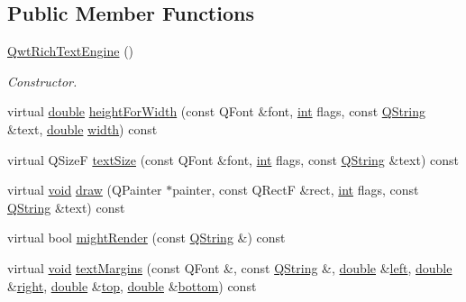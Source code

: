 \subsection*{Public Member Functions}
\begin{DoxyCompactItemize}
\item 
\hyperlink{class_qwt_rich_text_engine_aa4c1d5a1ee88d7406ba1d6453005b46a}{Qwt\-Rich\-Text\-Engine} ()
\begin{DoxyCompactList}\small\item\em Constructor. \end{DoxyCompactList}\item 
virtual \hyperlink{_super_l_u_support_8h_a8956b2b9f49bf918deed98379d159ca7}{double} \hyperlink{class_qwt_rich_text_engine_ab19cc5ad4ae33aaffc6aaf5d58b93b19}{height\-For\-Width} (const Q\-Font \&font, \hyperlink{ioapi_8h_a787fa3cf048117ba7123753c1e74fcd6}{int} flags, const \hyperlink{group___u_a_v_objects_plugin_gab9d252f49c333c94a72f97ce3105a32d}{Q\-String} \&text, \hyperlink{_super_l_u_support_8h_a8956b2b9f49bf918deed98379d159ca7}{double} \hyperlink{glext_8h_a76aaa5c50746272e7d2de9aece921757}{width}) const 
\item 
virtual Q\-Size\-F \hyperlink{class_qwt_rich_text_engine_a0dc185454c60931a0c136fc61774abfb}{text\-Size} (const Q\-Font \&font, \hyperlink{ioapi_8h_a787fa3cf048117ba7123753c1e74fcd6}{int} flags, const \hyperlink{group___u_a_v_objects_plugin_gab9d252f49c333c94a72f97ce3105a32d}{Q\-String} \&text) const 
\item 
virtual \hyperlink{group___u_a_v_objects_plugin_ga444cf2ff3f0ecbe028adce838d373f5c}{void} \hyperlink{class_qwt_rich_text_engine_a8f345540be2a90db3ce5a252ec443ce7}{draw} (Q\-Painter $\ast$painter, const Q\-Rect\-F \&rect, \hyperlink{ioapi_8h_a787fa3cf048117ba7123753c1e74fcd6}{int} flags, const \hyperlink{group___u_a_v_objects_plugin_gab9d252f49c333c94a72f97ce3105a32d}{Q\-String} \&text) const 
\item 
virtual bool \hyperlink{class_qwt_rich_text_engine_a42da46eee5fbda55e34b18c64b0b5e0b}{might\-Render} (const \hyperlink{group___u_a_v_objects_plugin_gab9d252f49c333c94a72f97ce3105a32d}{Q\-String} \&) const 
\item 
virtual \hyperlink{group___u_a_v_objects_plugin_ga444cf2ff3f0ecbe028adce838d373f5c}{void} \hyperlink{class_qwt_rich_text_engine_a3d507f2cad8ce44d0ee5da3070b943ca}{text\-Margins} (const Q\-Font \&, const \hyperlink{group___u_a_v_objects_plugin_gab9d252f49c333c94a72f97ce3105a32d}{Q\-String} \&, \hyperlink{_super_l_u_support_8h_a8956b2b9f49bf918deed98379d159ca7}{double} \&\hyperlink{glext_8h_a85b8f6c07fbc1fb5d77c2ae090f21995}{left}, \hyperlink{_super_l_u_support_8h_a8956b2b9f49bf918deed98379d159ca7}{double} \&\hyperlink{glext_8h_a5ffadbbacc6b89cf6218bc43b384d3fe}{right}, \hyperlink{_super_l_u_support_8h_a8956b2b9f49bf918deed98379d159ca7}{double} \&\hyperlink{glext_8h_a5ab323daeacf8dfdb8f91132fecdca23}{top}, \hyperlink{_super_l_u_support_8h_a8956b2b9f49bf918deed98379d159ca7}{double} \&\hyperlink{glext_8h_a95fc257e5ddf46f7db9d5e898cdf1991}{bottom}) const 
\end{DoxyCompactItemize}
